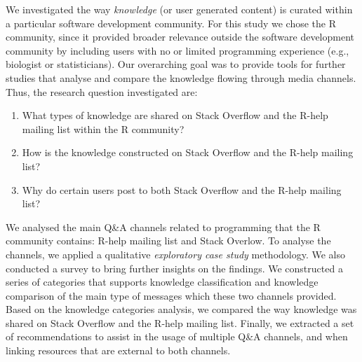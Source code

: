     We investigated the way \textit{knowledge} (or user generated content) is curated within a particular software development community.
    For this study we chose the R community, since it provided broader relevance outside the software development community by including users with no or limited programming experience (e.g., biologist or statisticians).
    Our overarching goal was to provide tools for further studies that analyse and compare the knowledge flowing through media channels.
    Thus, the research question investigated are:

    \begin{enumerate}[label=\bfseries{RQ-\arabic*.},itemsep=3pt, topsep=2pt, leftmargin=3em, parsep=0pt]
        \item What types of knowledge are shared on Stack Overflow and the R-help mailing list within the R community?
        \item How is the knowledge constructed on Stack Overflow and the R-help mailing list? 
        \item Why do certain users post to both Stack Overflow and the R-help mailing list?
    \end{enumerate}

We analysed the main Q\&A channels related to programming that the R community contains: R-help mailing list and Stack Overlow.
To analyse the channels, we applied a qualitative \textit{exploratory case study} methodology.
We also conducted a survey to bring further insights on the findings.
We constructed a series of categories that supports knowledge classification and knowledge comparison of the main type of messages which these two channels provided.
Based on the knowledge categories analysis, we compared the way knowledge was shared on Stack Overflow and the R-help mailing list.
Finally, we extracted a set of recommendations to assist in the usage of multiple Q\&A channels, and when linking resources that are external to both channels.


